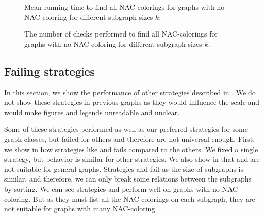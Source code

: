 \begin{figure}[p]
	\centering
	\scalebox{0.5}{}
	\caption[Mean runtime for graphs with no NAC-coloring.]{
		Mean running time to find all NAC-colorings for graphs with no NAC-coloring for different subgraph sizes \( k \).}%
	\label{fig:graph_no_nac_coloring_first_runtime_subgraph_size}
\end{figure}%
\begin{figure}[p]
	\centering
	\scalebox{0.5}{}
	\caption[Checks performed for graphs with no NAC-coloring.]{
		The number of checks performed to find all NAC-colorings for graphs with no NAC-coloring for different subgraph sizes \( k \).}%
	\label{fig:graph_no_nac_coloring_first_checks_subgraph_size}
\end{figure}%



\subsection{Failing strategies}%
\label{sec:failing_strategies}

In this section, we show the performance of other strategies described in .
We do not show these strategies in previous graphs as they would influence
the scale and would make figures and legends unreadable and unclear.

Some of these strategies performed as well as our preferred strategies for some graph classes,
but failed for others and therefore are not universal enough.
%
First, we show in 
how strategies like \Log{} and \PromisingCycles{} fails compared to the others.
We fixed a single strategy, but behavior is similar for other strategies.
We also show in 
that \KernighanLin{} and \Cuts{} are not suitable for general graphs.
%
Strategies \SortedBits{} and \MinMax{} fail as the size of subgraphs is similar,
and therefore, we can only break some relations between the subgraphs by sorting.
%
We can see strategies \SortedSize{} and \Score{} perform well
on graphs with no NAC-coloring. But as they must list all the NAC-colorings
on each subgraph, they are not suitable for graphs with many NAC-coloring.

